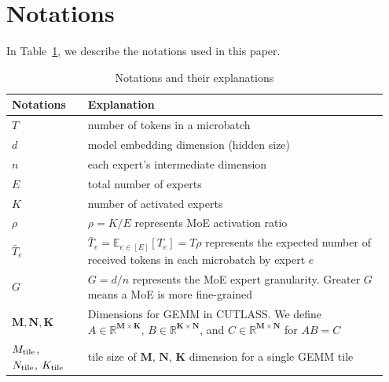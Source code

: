 \section{Notations}\label{sec:appendix:notations}
In Table~\ref{tab:notations}, we describe the notations used in this paper.


\begin{table}[!ht]
    \setlength{\tabcolsep}{2pt} %
    \renewcommand{\arraystretch}{0} %
    \fontsize{8pt}{8pt}\selectfont
    \caption{\small Notations and their explanations}\label{tab:notations}
    \begin{center}
    \centering
    \begin{tabular}{p{0.15\linewidth}p{0.0\linewidth}p{0.80\linewidth}}
    \toprule
    \textbf{Notations} && \textbf{Explanation} \\
    \midrule
     $T$ & & number of tokens in a microbatch \\\midrule
     
     $d$ & & model embedding dimension (hidden size)  \\\midrule

     $n$ & & each expert's intermediate dimension \\\midrule

     $E$ &&  total number of experts 
     \\ \midrule
  
    $K$ && number of activated experts \\ \midrule

    $\rho$ && $\rho = K/E$ represents MoE activation ratio \\ \midrule

     $\bar{T}_e$ & & $\bar{T}_e = \mathbb{E}_{e\in[E]} [T_e] =  T \rho$ represents the expected number of received tokens in each microbatch by expert $e$ \\\midrule

    $G$ && $G = d/n$ represents the MoE expert granularity. Greater $G$ means a MoE is more fine-grained \\ \midrule

    $\mathbf{M}, \mathbf{N}, \mathbf{K}$ && Dimensions for GEMM in CUTLASS. We define $A \in \mathbb{R}^{\mathbf{M} \times \mathbf{K}}$, $B \in \mathbb{R}^{\mathbf{K} \times \mathbf{N}}$, and $C \in \mathbb{R}^{\mathbf{M} \times \mathbf{N}}$ for $A B = C$  \\ \midrule

    $M_\mathrm{tile}$, $N_\mathrm{tile}$, $K_\mathrm{tile}$ && tile size of $\mathbf{M}$, $\mathbf{N}$, $\mathbf{K}$ dimension for a single GEMM tile \\ \midrule


\end{tabular}
\end{center}
\end{table}
